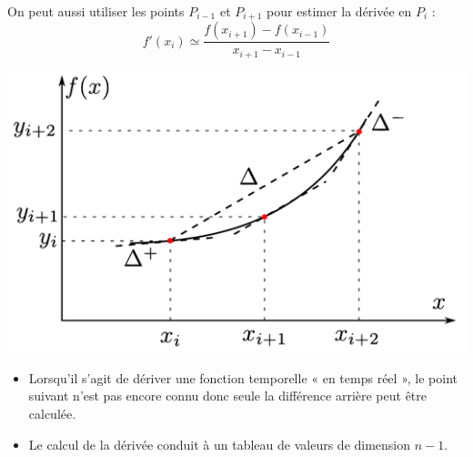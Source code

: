 \documentclass[10pt,fleqn]{article} %
\begin{document}
\begin{minipage}[c]{.49\linewidth}
\begin{resultat}

On peut aussi utiliser les points $P_{i-1}$ et $P_{i+1}$ pour estimer la dérivée en $P_i$ :
$$
f'(x_i)\simeq\dfrac{f(x_{i+1})-f(x_{i-1})}{x_{i+1}-x_{i-1}}
$$

\end{resultat}
\end{minipage}\hfill
\begin{minipage}[c]{.49\linewidth}
\begin{center}
\includegraphics[width=\textwidth]{images/derivation_2pas}
\end{center}
\end{minipage}

\begin{rem}
\begin{itemize}
\item Lorsqu’il s’agit de dériver une fonction temporelle « en temps réel », le point suivant n’est pas encore connu donc seule la différence arrière peut être calculée.
\item Le calcul de la dérivée conduit à un tableau de valeurs de dimension $n-1$.
\end{itemize}
\end{rem}



\begin{thebibliography}{2}
\end{thebibliography}
\end{document}
